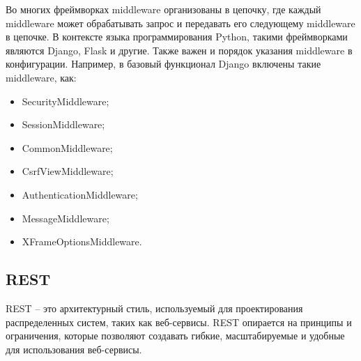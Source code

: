 Во многих фреймворках middleware организованы в цепочку, где каждый middleware может обрабатывать запрос и передавать его следующему middleware в цепочке.
В контексте языка программирования Python, такими фреймворками являются Django, Flask и другие.
Также важен и порядок указания middleware в конфигурации.
Например, в базовый функционал Django включены такие middleware, как:
\begin{itemize}
    \item SecurityMiddleware;
    \item SessionMiddleware;
    \item CommonMiddleware;
    \item CsrfViewMiddleware;
    \item AuthenticationMiddleware;
    \item MessageMiddleware;
    \item XFrameOptionsMiddleware.
\end{itemize}


\subsection{REST}\label{subsec:domain:rest}
REST -- это архитектурный стиль, используемый для проектирования распределенных систем, таких как веб-сервисы.
REST опирается на принципы и ограничения, которые позволяют создавать гибкие, масштабируемые и удобные для использования веб-сервисы.

